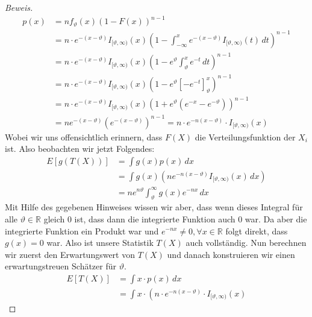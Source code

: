 \documentclass[a4paper]{article}
\begin{document}
\begin{theorem}
\begin{proof}[Beweis]
		\begin{align*}
			p(x) &= n f_\vartheta (x) (1 - F(x))^{n-1} \\
				 &= n \cdot e ^{- (x - \vartheta)}  I_{ [ \vartheta , \infty ) } (x) 
				 \left(
					 1 - \int_{-\infty}^{x} e ^{- (x - \vartheta)} I_{ [ \vartheta , \infty ) } (t) \, dt
				 \right) ^{n-1} \\
				 &= n \cdot e ^{- (x - \vartheta)}  I_{ [ \vartheta , \infty ) } (x) 
				 \left(
				 	1 - e ^{\vartheta} \int_{\vartheta }^{x} e ^{-t} \, dt
				 \right) ^{n-1} \\
				 &= n \cdot e ^{- (x - \vartheta)}  I_{ [ \vartheta , \infty ) } (x) 
				 \left(
				 	1 - e ^{\vartheta} \left[
						- e ^{-t}
					\right]_{\vartheta}^{x}
				 \right) ^{n-1} \\
				 &= n \cdot e ^{- (x - \vartheta)}  I_{ [ \vartheta , \infty ) } (x) 
				 \left(
				 	1 + e ^{\vartheta}
					\left(
						e ^{-x} - e ^{-\vartheta}
					\right) 
				\right) ^{n-1} \\
				 &= n e ^{- (x - \vartheta)}
				 \left(
					 e ^{- (x - \vartheta)}
				 \right) ^{n-1}
				 = n \cdot e ^{- n (x - \vartheta)} \cdot I_{ [ \vartheta , \infty ) } (x) 
		\end{align*}
		Wobei wir uns offensichtlich erinnern, dass $F(X)$ die Verteilungsfunktion der $X_i$ ist.
		Also beobachten wir jetzt Folgendes:
		\begin{align*}
			E \left[
				g(T(X))
			\right] &= \int g(x) p(x) \, dx \\
					&= \int g(x) \left(
						n e ^{-n (x - \vartheta)}
						I_{ [ \vartheta , \infty ) } (x) \, dx
					\right) \\
					&= n e ^{n \vartheta } \int_{\vartheta }^{\infty} g(x) e ^{- nx} \, dx
		\end{align*}
		Mit Hilfe des gegebenen Hinweises wissen wir aber, dass wenn dieses Integral für alle $\vartheta \in \mathbb{R}$
		gleich $0$ ist, dass dann die integrierte Funktion auch $0$ war.
		Da aber die integrierte Funktion ein Produkt war und $e ^{- n x } \neq 0, \forall x \in \mathbb{R}$
		folgt direkt, dass $g(x) = 0$ war. Also ist unsere Statistik $T(X)$ auch vollständig.
		Nun berechnen wir zuerst den Erwartungswert von $T(X)$ und danach konstruieren wir einen
		erwartungstreuen Schätzer für $\vartheta$.
		\begin{align*}
			E \left[
				T(X)
			\right] &= \int x \cdot p(x) \, dx \\
				&= \int x \cdot \left(
					 n \cdot e ^{- n (x - \vartheta)} \cdot I_{ [ \vartheta , \infty ) } (x) 

\end{align*}
\end{proof}
\end{theorem}
\end{document}
